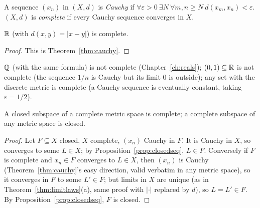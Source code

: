 \begin{definition}
	A sequence $(x_n)$ in $(X,d)$ is \emph{Cauchy} if $\forall\varepsilon>0\ \exists N\ \forall m,n\ge N\ d(x_m,x_n)<\varepsilon$. $(X,d)$ is \emph{complete} if every Cauchy sequence converges in $X$.
\end{definition}

\begin{theorem}
	$\mathbb{R}$ (with $d(x,y)=|x-y|$) is complete.
\end{theorem}
\begin{proof}
	This is Theorem~\ref{thm:cauchy}.
\end{proof}

\begin{example}
	$\mathbb{Q}$ (with the same formula) is not complete (Chapter~\ref{ch:reals}); $(0,1)\subseteq\mathbb{R}$ is not complete (the sequence $1/n$ is Cauchy but its limit $0$ is outside); any set with the discrete metric is complete (a Cauchy sequence is eventually constant, taking $\varepsilon=1/2$).
\end{example}

\begin{proposition}
	A closed subspace of a complete metric space is complete; a complete subspace of any metric space is closed.
\end{proposition}
\begin{proof}
	Let $F\subseteq X$ closed, $X$ complete, $(x_n)$ Cauchy in $F$. It is Cauchy in $X$, so converges to some $L\in X$; by Proposition~\ref{prop:closedseq}, $L\in F$. Conversely if $F$ is complete and $x_n\in F$ converges to $L\in X$, then $(x_n)$ is Cauchy (Theorem~\ref{thm:cauchy}'s easy direction, valid verbatim in any metric space), so it converges in $F$ to some $L'\in F$; but limits in $X$ are unique (as in Theorem~\ref{thm:limitlaws}(a), same proof with $|\cdot|$ replaced by $d$), so $L=L'\in F$. By Proposition~\ref{prop:closedseq}, $F$ is closed.
\end{proof}